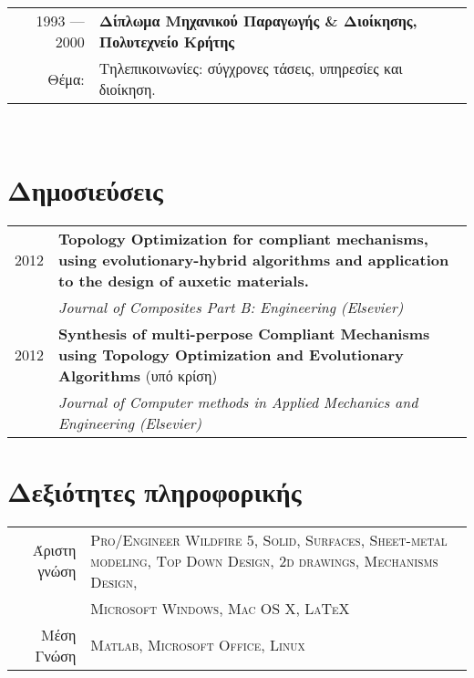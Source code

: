 \documentclass[11pt]{article} %
\begin{document}
{\begin{minipage}[t]{0.48\textwidth}
\begin{tabularx}{\linewidth}{r X}

1993 --- 2000 & \textbf{Δίπλωμα Μηχανικού Παραγωγής \& Διοίκησης, Πολυτεχνείο Κρήτης}\\
Θέμα:& Τηλεπικοινωνίες: σύγχρονες τάσεις, υπηρεσίες και διοίκηση.\\

\end{tabularx}
\\[10pt]


\section{Δημοσιεύσεις} 
\begin{tabularx}{\linewidth}{r X}
2012	 & \textbf{Topology Optimization for compliant mechanisms, using evolutionary-hybrid algorithms and application to the 
design of auxetic materials.}\\
& \textit{Journal of Composites Part B: Engineering (Elsevier)}\\


2012	& \textbf{Synthesis of multi-perpose Compliant Mechanisms using Topology Optimization and Evolutionary Algorithms} 
(υπό κρίση)\\
& \textit{Journal of Computer methods in Applied Mechanics and Engineering (Elsevier)}\\
\end{tabularx}


\section{Δεξιότητες πληροφορικής} 
\begin{tabularx}{\linewidth}{r X}
Άριστη γνώση
& \textsc{Pro/Engineer Wildfire 5, Solid, Surfaces, Sheet-metal modeling, Top Down Design, 2d drawings, Mechanisms Design,}\\
& \textsc{Microsoft Windows, Mac OS X, \LaTeX}\\
Μέση Γνώση
& \textsc{Matlab, Microsoft Office, Linux}\\


\end{tabularx}
\end{minipage}}
\end{document}
